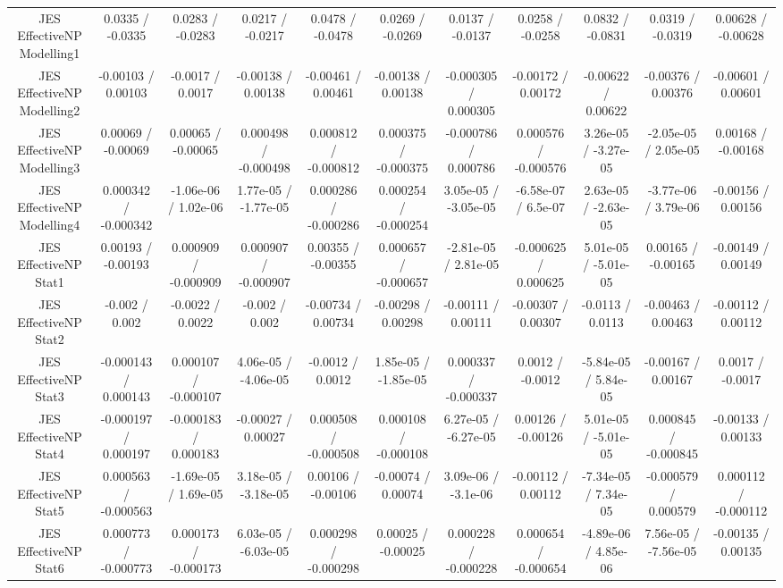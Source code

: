 \begin{table}[htbp]
\begin{center}
\begin{tabular}{|c|c|c|c|c|c|c|c|c|c|c|}
  JES EffectiveNP Modelling1 & 0.0335 / -0.0335 & 0.0283 / -0.0283 & 0.0217 / -0.0217 & 0.0478 / -0.0478 & 0.0269 / -0.0269 & 0.0137 / -0.0137 & 0.0258 / -0.0258 & 0.0832 / -0.0831 & 0.0319 / -0.0319 & 0.00628 / -0.00628 \\ 
  JES EffectiveNP Modelling2 & -0.00103 / 0.00103 & -0.0017 / 0.0017 & -0.00138 / 0.00138 & -0.00461 / 0.00461 & -0.00138 / 0.00138 & -0.000305 / 0.000305 & -0.00172 / 0.00172 & -0.00622 / 0.00622 & -0.00376 / 0.00376 & -0.00601 / 0.00601 \\ 
  JES EffectiveNP Modelling3 & 0.00069 / -0.00069 & 0.00065 / -0.00065 & 0.000498 / -0.000498 & 0.000812 / -0.000812 & 0.000375 / -0.000375 & -0.000786 / 0.000786 & 0.000576 / -0.000576 & 3.26e-05 / -3.27e-05 & -2.05e-05 / 2.05e-05 & 0.00168 / -0.00168 \\ 
  JES EffectiveNP Modelling4 & 0.000342 / -0.000342 & -1.06e-06 / 1.02e-06 & 1.77e-05 / -1.77e-05 & 0.000286 / -0.000286 & 0.000254 / -0.000254 & 3.05e-05 / -3.05e-05 & -6.58e-07 / 6.5e-07 & 2.63e-05 / -2.63e-05 & -3.77e-06 / 3.79e-06 & -0.00156 / 0.00156 \\ 
  JES EffectiveNP Stat1 & 0.00193 / -0.00193 & 0.000909 / -0.000909 & 0.000907 / -0.000907 & 0.00355 / -0.00355 & 0.000657 / -0.000657 & -2.81e-05 / 2.81e-05 & -0.000625 / 0.000625 & 5.01e-05 / -5.01e-05 & 0.00165 / -0.00165 & -0.00149 / 0.00149 \\ 
  JES EffectiveNP Stat2 & -0.002 / 0.002 & -0.0022 / 0.0022 & -0.002 / 0.002 & -0.00734 / 0.00734 & -0.00298 / 0.00298 & -0.00111 / 0.00111 & -0.00307 / 0.00307 & -0.0113 / 0.0113 & -0.00463 / 0.00463 & -0.00112 / 0.00112 \\ 
  JES EffectiveNP Stat3 & -0.000143 / 0.000143 & 0.000107 / -0.000107 & 4.06e-05 / -4.06e-05 & -0.0012 / 0.0012 & 1.85e-05 / -1.85e-05 & 0.000337 / -0.000337 & 0.0012 / -0.0012 & -5.84e-05 / 5.84e-05 & -0.00167 / 0.00167 & 0.0017 / -0.0017 \\ 
  JES EffectiveNP Stat4 & -0.000197 / 0.000197 & -0.000183 / 0.000183 & -0.00027 / 0.00027 & 0.000508 / -0.000508 & 0.000108 / -0.000108 & 6.27e-05 / -6.27e-05 & 0.00126 / -0.00126 & 5.01e-05 / -5.01e-05 & 0.000845 / -0.000845 & -0.00133 / 0.00133 \\ 
  JES EffectiveNP Stat5 & 0.000563 / -0.000563 & -1.69e-05 / 1.69e-05 & 3.18e-05 / -3.18e-05 & 0.00106 / -0.00106 & -0.00074 / 0.00074 & 3.09e-06 / -3.1e-06 & -0.00112 / 0.00112 & -7.34e-05 / 7.34e-05 & -0.000579 / 0.000579 & 0.000112 / -0.000112 \\ 
  JES EffectiveNP Stat6 & 0.000773 / -0.000773 & 0.000173 / -0.000173 & 6.03e-05 / -6.03e-05 & 0.000298 / -0.000298 & 0.00025 / -0.00025 & 0.000228 / -0.000228 & 0.000654 / -0.000654 & -4.89e-06 / 4.85e-06 & 7.56e-05 / -7.56e-05 & -0.00135 / 0.00135 \\ 

\end{tabular}
\end{center}
\end{table}
